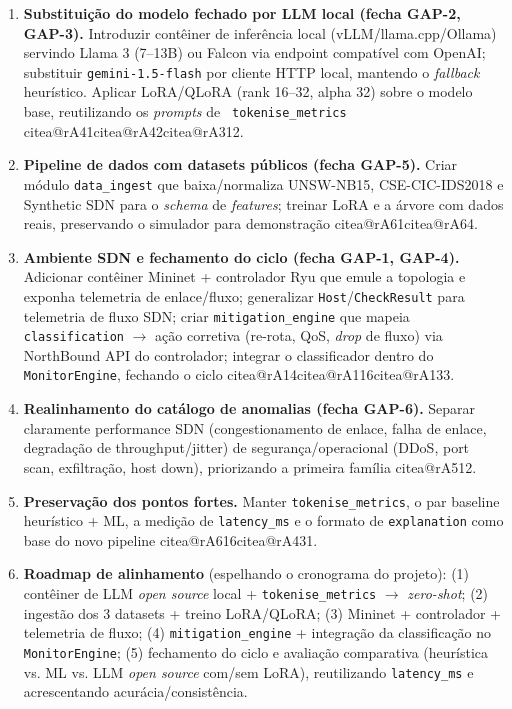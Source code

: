 \documentclass[12pt,a4paper]{article}
\makeatletter
\newcommand{\citea}[1]{\begingroup\edef\@currentlabel{\csname citea@#1\endcsname}\@currentlabel\endgroup}
\makeatother
\begin{document}
\begin{enumerate}
  \item \textbf{Substituição do modelo fechado por LLM local (fecha GAP-2,
  GAP-3).} Introduzir contêiner de inferência local (vLLM/llama.cpp/Ollama)
  servindo Llama 3 (7--13B) ou Falcon via endpoint compatível com OpenAI;
  substituir \texttt{gemini-1.5-flash} por cliente HTTP local, mantendo o
  \textit{fallback} heurístico. Aplicar LoRA/QLoRA (rank 16--32, alpha 32)
  sobre o modelo base, reutilizando os \textit{prompts} de \texttt{
  tokenise\_metrics} \citea{rA41}\citea{rA42}\citea{rA312}.
  \item \textbf{Pipeline de dados com datasets públicos (fecha GAP-5).} Criar
  módulo \texttt{data\_ingest} que baixa/normaliza UNSW-NB15, CSE-CIC-IDS2018
  e Synthetic SDN para o \textit{schema} de \textit{features}; treinar LoRA e a
  árvore com dados reais, preservando o simulador para demonstração \citea{rA61}\citea{rA64}.
  \item \textbf{Ambiente SDN e fechamento do ciclo (fecha GAP-1, GAP-4).}
  Adicionar contêiner Mininet + controlador Ryu que emule a topologia e exponha
  telemetria de enlace/fluxo; generalizar \texttt{Host}/\texttt{CheckResult}
  para telemetria de fluxo SDN; criar \texttt{mitigation\_engine} que mapeia
  \texttt{classification} $\rightarrow$ ação corretiva (re-rota, QoS,
  \textit{drop} de fluxo) via NorthBound API do controlador; integrar o
  classificador dentro do \texttt{MonitorEngine}, fechando o ciclo \citea{rA14}\citea{rA116}\citea{rA133}.
  \item \textbf{Realinhamento do catálogo de anomalias (fecha GAP-6).}
  Separar claramente performance SDN (congestionamento de enlace, falha de
  enlace, degradação de throughput/jitter) de segurança/operacional (DDoS, port
  scan, exfiltração, host down), priorizando a primeira família \citea{rA512}.
  \item \textbf{Preservação dos pontos fortes.} Manter \texttt{tokenise\_metrics},
  o par baseline heurístico + ML, a medição de \texttt{latency\_ms} e o formato
  de \texttt{explanation} como base do novo pipeline \citea{rA616}\citea{rA431}.
  \item \textbf{Roadmap de alinhamento} (espelhando o cronograma do projeto):
  (1) contêiner de LLM \textit{open source} local + \texttt{tokenise\_metrics}
  $\rightarrow$ \textit{zero-shot}; (2) ingestão dos 3 datasets + treino
  LoRA/QLoRA; (3) Mininet + controlador + telemetria de fluxo; (4)
  \texttt{mitigation\_engine} + integração da classificação no
  \texttt{MonitorEngine}; (5) fechamento do ciclo e avaliação comparativa
  (heurística vs. ML vs. LLM \textit{open source} com/sem LoRA), reutilizando
  \texttt{latency\_ms} e acrescentando acurácia/consistência.
\end{enumerate}
\end{document}

